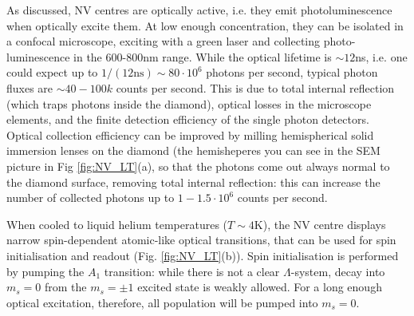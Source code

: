 \documentclass[a4paper,11pt]{article}
\begin{document}
As discussed, NV centres are optically active, i.e. they emit photoluminescence when optically excite them. At low enough concentration, they can be isolated in a confocal microscope, exciting with a green laser and collecting photo-luminescence in the 600-800nm range. While the optical lifetime is $\sim 12$ns, i.e. one could expect up to $1/(12 \mbox{ns}) \sim 80 \cdot 10^6$ photons per second, typical photon fluxes are $\sim 40-100k$ counts per second. This is due to total internal reflection (which traps photons inside the diamond), optical losses in the microscope elements, and the finite detection efficiency of the single photon detectors. Optical collection efficiency can be improved by milling hemispherical solid immersion lenses on the diamond (the hemisheperes you can see in the SEM picture in Fig \ref{fig:NV_LT}(a), so that the photons come out always normal to the diamond surface, removing total internal reflection: this can increase the number of collected photons up to $1-1.5 \cdot 10^6$ counts per second.

When cooled to liquid helium temperatures ($T \sim 4$K), the NV centre displays narrow spin-dependent atomic-like optical transitions, that can be used for spin initialisation and readout (Fig. \ref{fig:NV_LT}(b)). Spin initialisation is performed by pumping the $A_1$ transition: while there is not a clear $\Lambda$-system, decay into $m_s = 0$ from the $m_s = \pm 1$ excited state is weakly allowed. For a long enough optical excitation, therefore, all population will be pumped into $m_s = 0$.
\end{document}
